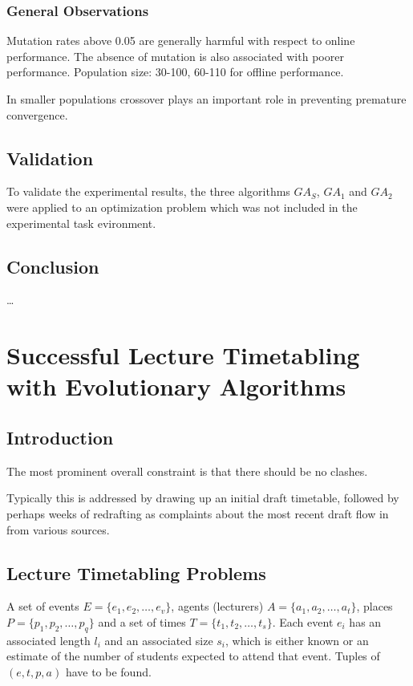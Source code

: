 \documentclass[12pt]{book}
\begin{document}
\subsection{General Observations}
Mutation rates above 0.05 are generally harmful with respect to online performance. The absence of mutation is also associated with poorer performance. Population size: 30-100, 60-110 for offline performance.

In smaller populations crossover plays an important role in preventing premature convergence.

\section{Validation}
To validate the experimental results, the three algorithms $GA_S$, $GA_1$ and $GA_2$ were applied to an optimization problem which was not included in the experimental task evironment.

\section{Conclusion}
\dots
\clearpage

\chapter{Successful Lecture Timetabling with Evolutionary Algorithms}
\section{Introduction}
The most prominent overall constraint is that there should be no clashes.

Typically this is addressed by drawing up an initial draft timetable, followed by perhaps weeks of redrafting as complaints about the most recent draft flow in from various sources.

\section{Lecture Timetabling Problems}
A set of events $E = \{e_1, e_2, \dots, e_v\}$, agents (lecturers) $A = \{a_1, a_2, \dots, a_t\}$, places $P = \{p_1, p_2, \dots, p_q\}$ and a set of times $T = \{t_1, t_2, \dots, t_s\}$. Each event $e_i$ has an associated length $l_i$ and an associated size $s_i$, which is either known or an estimate of the number of students expected to attend that event. Tuples of $(e, t, p, a)$ have to be found.
\end{document}
